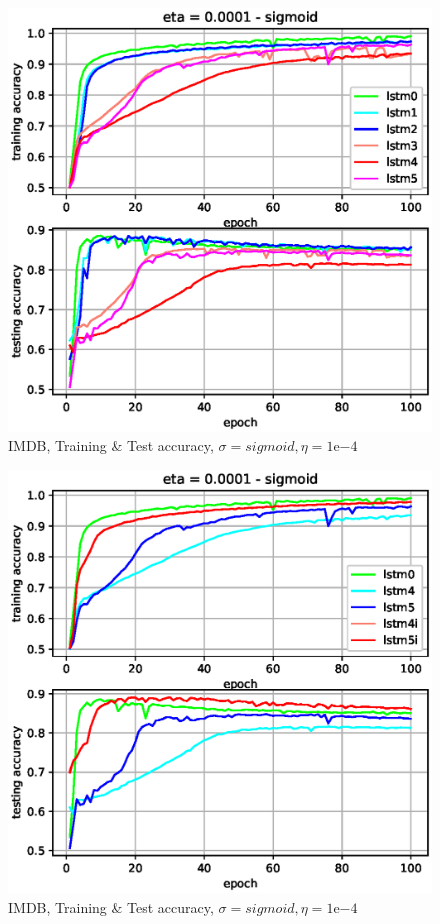 \documentclass{article}
\begin{document}
{{{{{{\begin{figure}[H]
	\centering
	\includegraphics[trim={0 0 0 0},clip,scale=0.42]{imdb-1.eps}
	\caption{IMDB, Training \& Test accuracy, $\sigma=sigmoid , \eta=1\mathrm{e}{-4}$}
	\label{im0001}
\end{figure}

\begin{figure}[H]
	\centering
	\includegraphics[trim={0 0 0 0},clip,scale=0.42]{imdb-2.eps}
	\caption{IMDB, Training \& Test accuracy, $\sigma=sigmoid , \eta=1\mathrm{e}{-4}$}
	\label{im0002}
\end{figure}

}}}}}}
\end{document}

